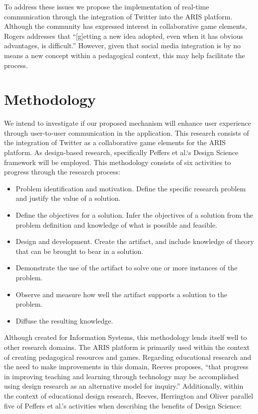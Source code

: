 \documentclass{sigchi}
\begin{document}
To address these issues we propose the implementation of real-time communication through the integration of Twitter into the ARIS platform. Although the community has expressed interest in collaborative game elements, Rogers addresses that ``[g]etting a new idea adopted, even when it has obvious advantages, is difficult.''\cite{rogers2003diffusion} However, given that social media integration is by no means a new concept within a pedagogical context, this may help facilitate the process.

\section{Methodology}
We intend to investigate if our proposed mechanism will enhance user experience through user-to-user communication in the application. This research consists of the integration of Twitter as a collaborative game elements for the ARIS platform. As design-based research, specifically Peffers et al.`s Design Science framework will be employed.\cite{peffers2007design} This methodology consists of six activities to progress through the research process:

\begin{itemize}
  \item Problem identification and motivation. Define the specific research problem and justify the value of a solution.
  \item Define the objectives for a solution. Infer the objectives of a solution from the problem definition and knowledge of what is possible and feasible.
  \item Design and development. Create the artifact, and include knowledge of theory that can be brought to bear in a solution.
  \item Demonstrate the use of the artifact to solve one or more instances of the problem.
  \item Observe and measure how well the artifact supports a solution to the problem.
  \item Diffuse the resulting knowledge. 
\end{itemize}

Although created for Information Systems, this methodology lends itself well to other research domains. The ARIS platform is primarily used within the context of creating pedagogical resources and games. Regarding educational research and the need to make improvements in this domain, Reeves proposes, ``that progress in improving teaching and learning through technology may be accomplished using design research as an alternative model for inquiry.''\cite{reeves2006design} Additionally, within the context of educational design research, Reeves, Herrington and Oliver parallel five of Peffers et al.’s activities when describing the benefits of Design Science:
\end{document}
